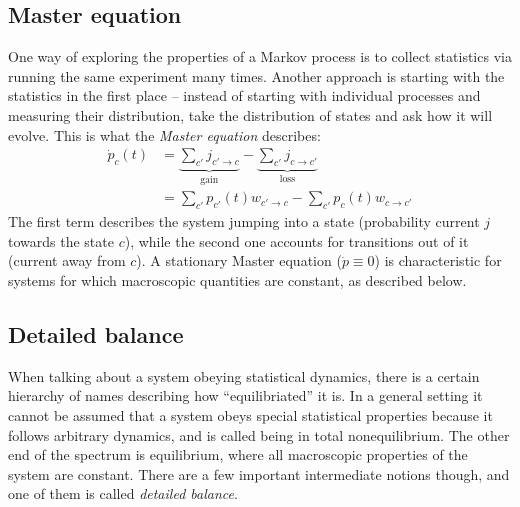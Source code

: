 \subsection{Master equation}
\label{sec:master equation}

One way of exploring the properties of a Markov process is to collect statistics via running the same experiment many times. Another approach is starting with the statistics in the first place -- instead of starting with individual processes and measuring their distribution, take the distribution of states and ask how it will evolve. This is what the \emph{Master equation} describes:
%
\begin{align}
	\label{eqn:master}
	\dot p_c(t)
		&= \underbrace{\sum_{c'} j_{c'\to c}}_{\text{gain}}
		- \underbrace{\sum_{c'} j_{c\to c'}}_{\text{loss}} \\
		&= \sum_{c'} p_{c'}(t)w_{c'\to c}
		- \sum_{c'} p_c(t)w_{c\to c'}
\end{align}
%
The first term describes the system jumping into a state (probability current \(j\) towards the state \(c\)), while the second one accounts for transitions out of it (current away from \(c\)). A stationary Master equation (\(\dot p \equiv 0\)) is characteristic for systems for which macroscopic quantities are constant, as described below.






\subsection{Detailed balance}
\label{sec:detailed balance}

When talking about a system obeying statistical dynamics, there is a certain hierarchy of names describing how ``equilibriated'' it is. In a general setting it cannot be assumed that a system obeys special statistical properties because it follows arbitrary dynamics, and is called being in total nonequilibrium. The other end of the spectrum is equilibrium, where all macroscopic properties of the system are constant. There are a few important intermediate notions though, and one of them is called \emph{detailed balance}.

